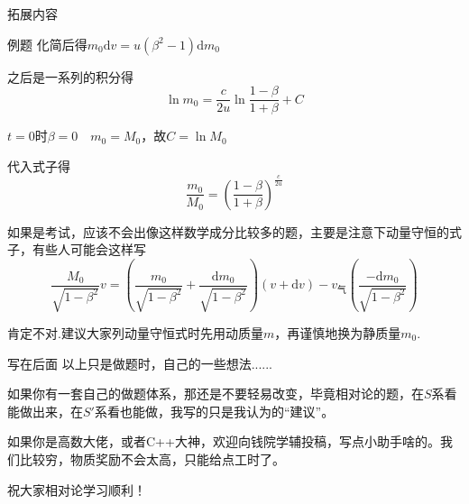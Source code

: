 \documentclass[a4paper,titlepage,onecolmn]{ctexart}
\newcommand{\di}[1]{\mathrm{d}#1}
\begin{document}
\begin{section}{拓展内容}
\begin{subsection}{例题}
化简后得$m_0\di v=u(\beta^2-1)\di m_0$

之后是一系列的积分得
\begin{equation*}
\ln m_0=\frac{c}{2u}\ln \frac{1-\beta}{1+\beta}+C
\end{equation*}

$t=0$时$\beta=0\hspace{1em}m_0=M_0$，故$C=\ln M_0$

代入式子得
\begin{equation*}
\frac{m_0}{M_0}=(\frac{1-\beta}{1+\beta})^{\frac{c}{2u}}
\end{equation*}

如果是考试，应该不会出像这样数学成分比较多的题，主要是注意下动量守恒的式子，有些人可能会这样写
\begin{equation*}
\frac{M_0}{\sqrt{1-\beta^2}}v=(\frac{m_0}{\sqrt{1-\beta^2}}+\frac{\di m_0}{\sqrt{1-\beta^2}})(v+\di v)
-v_{\mbox{气}}(\frac{-\di m_0}{\sqrt{1-\beta^2}})
\end{equation*}

肯定不对.建议大家列动量守恒式时先用动质量$m$，再谨慎地换为静质量$m_0$.
\end{subsection}
\end{section}

\begin{section}{写在后面}
以上只是做题时，自己的一些想法......

如果你有一套自己的做题体系，那还是不要轻易改变，毕竟相对论的题，在$S$系看能做出来，在$S'$系看也能做，我写的只是我认为的“建议”。

如果你是高数大佬，或者C++大神，欢迎向钱院学辅投稿，写点小助手啥的。我们比较穷，物质奖励不会太高，只能给点工时了。

祝大家相对论学习顺利！
\end{section}
\end{document}
